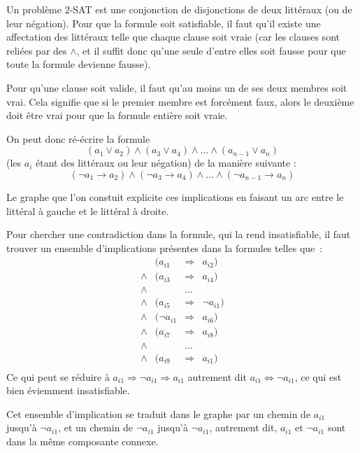 \documentclass{article}
\begin{document}
Un problème 2-SAT est une conjonction de disjonctions de deux littéraux (ou de leur négation). Pour que la formule soit satisfiable, il faut
qu'il existe une affectation des littéraux telle que chaque clause soit vraie (car les clauses sont reliées par des $\wedge$, et il suffit
donc qu'une seule d'entre elles soit fausse pour que toute la formule devienne fausse).

Pour qu'une clause soit valide, il faut qu'au moins un de ses deux membres soit vrai. Cela signifie que si le premier membre est forcément
faux, alors le deuxième doit être vrai pour que la formule entière soit vraie.

On peut donc ré-écrire la formule
$$(a_1 \vee a_2) \wedge (a_3 \vee a_4) \wedge \dots \wedge (a_{n-1} \vee a_n)$$
(les $a_i$ étant des littéraux ou leur négation) de la manière suivante :
$$(\lnot a_1 \rightarrow a_2) \wedge (\lnot a_3 \rightarrow a_4) \wedge \dots \wedge (\lnot a_{n-1} \rightarrow a_n)$$

Le graphe que l'on constuit explicite ces implications en faisant un arc entre le littéral à gauche et le littéral à droite.

Pour chercher une contradiction dans la formule, qui la rend insatisfiable, il faut trouver un ensemble d'implications présentes dans la
formules telles que~:
$$
\begin{array}{rrcl}
       & (a_{i1} & \Rightarrow & a_{i2}) \\
  \wedge & (a_{i3} & \Rightarrow & a_{i4}) \\
  \wedge & & \dots & \\
  \wedge & (a_{i5} & \Rightarrow & \lnot a_{i1}) \\
  \wedge & (\lnot a_{i1} & \Rightarrow & a_{i6}) \\
  \wedge & (a_{i7} & \Rightarrow & a_{i8}) \\
  \wedge & & \dots & \\
  \wedge & (a_{i9} & \Rightarrow & a_{i1}) \\
\end{array}
$$
Ce qui peut se réduire à $a_{i1} \Rightarrow \lnot a_{i1} \Rightarrow a_{i1}$ autrement dit $a_{i1} \Leftrightarrow \lnot a_{i1}$, ce qui
est bien éviemment insatisfiable.

Cet ensemble d'implication se traduit dans le graphe par un chemin de $a_{i1}$ jusqu'à $\lnot a_{i1}$, et un chemin de $\lnot a_{i1}$
jusqu'à $\lnot a_{i1}$, autrement dit, $a_{i1}$ et $\lnot a_{i1}$ sont dans la même composante connexe.
\end{document}
